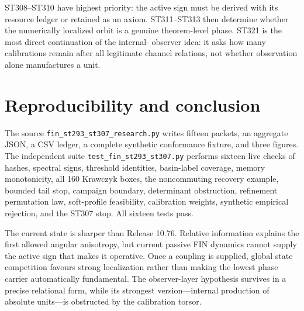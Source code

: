 \documentclass[11pt,a4paper]{article}
\begin{document}
ST308--ST310 have highest priority: the active sign must be derived with its resource ledger
or retained as an axiom. ST311--ST313 then determine whether the numerically localized orbit
is a genuine theorem-level phase. ST321 is the most direct continuation of the internal-
observer idea: it asks how many calibrations remain after all legitimate channel relations,
not whether observation alone manufactures a unit.

\section{Reproducibility and conclusion}

The source \texttt{fin\_st293\_st307\_research.py} writes fifteen packets, an aggregate JSON,
a CSV ledger, a complete synthetic conformance fixture, and three figures. The independent
suite \texttt{test\_fin\_st293\_st307.py} performs sixteen live checks of hashes, spectral
signs, threshold identities, basin-label coverage, memory monotonicity, all 160 Krawczyk
boxes, the noncommuting recovery example, bounded tail stop, campaign boundary, determinant
obstruction, refinement permutation law, soft-profile feasibility, calibration weights,
synthetic empirical rejection, and the ST307 stop. All sixteen tests pass.

The current state is sharper than Release 10.76. Relative information explains the first
allowed angular anisotropy, but current passive FIN dynamics cannot supply the active sign
that makes it operative. Once a coupling is supplied, global state competition favours
strong localization rather than making the lowest phase carrier automatically fundamental.
The observer-layer hypothesis survives in a precise relational form, while its strongest
version---internal production of absolute units---is obstructed by the calibration torsor.
\end{document}
